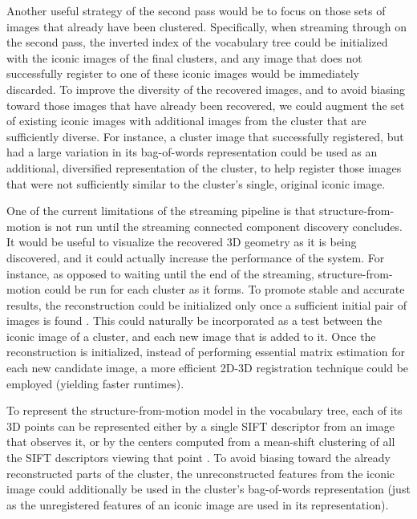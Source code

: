 Another useful strategy of the second pass would be to focus on those sets of images that already have been clustered.
Specifically, when streaming through on the second pass, the inverted index of the vocabulary tree could be initialized with the iconic images of the final clusters, and any image that does not successfully register to one of these iconic images would be immediately discarded.
To improve the diversity of the recovered images, and to avoid biasing toward those images that have already been recovered, we could augment the set of existing iconic images with additional images from the cluster that are sufficiently diverse.
For instance, a cluster image that successfully registered, but had a large variation in its bag-of-words representation could be used as an additional, diversified representation of the cluster, to help register those images that were not sufficiently similar to the cluster's single, original iconic image.

One of the current limitations of the streaming pipeline is that structure-from-motion is not run until the streaming connected component discovery concludes.
It would be useful to visualize the recovered 3D geometry as it is being discovered, and it could actually increase the performance of the system.
For instance, as opposed to waiting until the end of the streaming, structure-from-motion could be run for each cluster as it forms.
To promote stable and accurate results, the reconstruction could be initialized only once a sufficient initial pair of images is found \cite{beder2006_initial_pair}.
This could naturally be incorporated as a test between the iconic image of a cluster, and each new image that is added to it.
Once the reconstruction is initialized, instead of performing essential matrix estimation for each new candidate image, a more efficient 2D-3D registration technique could be employed (yielding faster runtimes).

To represent the structure-from-motion model in the vocabulary tree, each of its 3D points can be represented either by a single SIFT descriptor from an image that observes it, or by the centers computed from a mean-shift clustering of all the SIFT descriptors viewing that point \cite{pollefeys2010_challenges_sfm}.
To avoid biasing toward the already reconstructed parts of the cluster, the unreconstructed features from the iconic image could additionally be used in the cluster's bag-of-words representation (just as the unregistered features of an iconic image are used in its representation).

